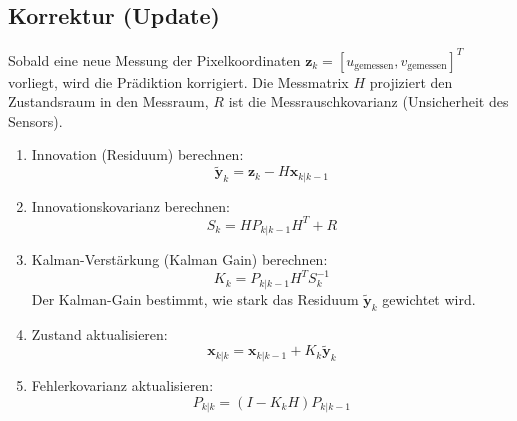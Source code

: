 \subsection{Korrektur (Update)}
Sobald eine neue Messung der Pixelkoordinaten $\mathbf{z}_k = [u_{\text{gemessen}}, v_{\text{gemessen}}]^T$ vorliegt, wird die Prädiktion korrigiert. Die Messmatrix $H$ projiziert den Zustandsraum in den Messraum, $R$ ist die Messrauschkovarianz (Unsicherheit des Sensors).
\begin{enumerate}
    \item Innovation (Residuum) berechnen:
        \begin{equation}
            \tilde{\mathbf{y}}_k = \mathbf{z}_k - H \mathbf{x}_{k|k-1}
        \end{equation}
    \item Innovationskovarianz berechnen:
        \begin{equation}
            S_k = H P_{k|k-1} H^T + R
        \end{equation}
    \item Kalman-Verstärkung (Kalman Gain) berechnen:
        \begin{equation}
            K_k = P_{k|k-1} H^T S_k^{-1}
        \end{equation}
        Der Kalman-Gain bestimmt, wie stark das Residuum $\tilde{\mathbf{y}}_k$ gewichtet wird.
    \item Zustand aktualisieren:
        \begin{equation}
            \mathbf{x}_{k|k} = \mathbf{x}_{k|k-1} + K_k \tilde{\mathbf{y}}_k
        \end{equation}
    \item Fehlerkovarianz aktualisieren:
        \begin{equation}
            P_{k|k} = (I - K_k H) P_{k|k-1}
        \end{equation}
\end{enumerate}

